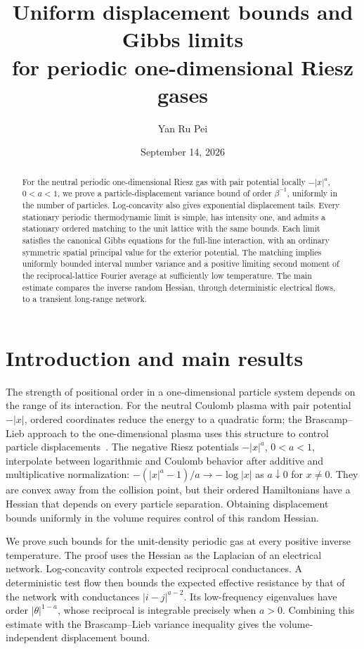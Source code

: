 \documentclass[11pt]{article}
\title{Uniform displacement bounds and Gibbs limits\\for periodic one-dimensional Riesz gases}
\author{Yan Ru Pei}
\date{September 14, 2026}
\theoremstyle{remark}\newtheorem{remark}[theorem]{Remark}
\begin{document}
\maketitle
\begin{abstract}
For the neutral periodic one-dimensional Riesz gas with pair potential
locally $-|x|^a$, $0<a<1$, we prove a particle-displacement variance
bound of order $\beta^{-1}$, uniformly in the number of particles.
Log-concavity also gives exponential displacement tails.
Every stationary periodic thermodynamic limit is simple, has intensity
one, and admits a stationary ordered matching to the unit lattice with
the same bounds. Each limit satisfies the canonical Gibbs equations
for the full-line interaction, with an ordinary symmetric spatial
principal value for the exterior potential.
The matching implies uniformly bounded interval number variance and
a positive limiting second moment of the reciprocal-lattice Fourier
average at sufficiently low temperature.
The main estimate compares the inverse random Hessian, through
deterministic electrical flows, to a transient long-range network.
\end{abstract}

\section{Introduction and main results}

The strength of positional order in a one-dimensional particle system
depends on the range of its interaction. For the neutral Coulomb plasma
with pair potential $-|x|$, ordered coordinates reduce the energy to a quadratic form;
the Brascamp--Lieb approach to the one-dimensional plasma uses this
structure to control particle displacements~\cite{BL1975}.
The negative Riesz potentials $-|x|^a$, $0<a<1$, interpolate between
logarithmic and Coulomb behavior after additive and multiplicative
normalization: $-(|x|^a-1)/a\to-\log|x|$ as $a\downarrow0$ for $x\ne0$.
They are convex away from the
collision point, but their ordered Hamiltonians have a Hessian that
depends on every particle separation. Obtaining displacement bounds
uniformly in the volume requires control of this random Hessian.

We prove such bounds for the unit-density periodic gas at every
positive inverse temperature. The proof uses the Hessian as the
Laplacian of an electrical network. Log-concavity controls expected
reciprocal conductances. A deterministic test flow then bounds the
expected effective resistance by that of the network with conductances
$|i-j|^{a-2}$. Its low-frequency eigenvalues have order
$|\theta|^{1-a}$, whose reciprocal is integrable precisely when $a>0$.
Combining this estimate with the Brascamp--Lieb variance inequality
gives the volume-independent displacement bound.
\end{document}
